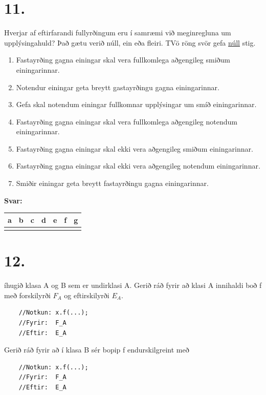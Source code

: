 \documentclass{article}
\newcommand{\sv}{\textbf{Svar:}}
\newcommand{\enum}{\begin{enumerate}[label = \alph*.]}
\begin{document}
    \newpage
    \section{11.}
    Hverjar af eftirfarandi fullyrðingum eru í samræmi við meginregluna um upplýsingahuld? 
    Það gætu verið núll, ein eða fleiri. TVö röng svör gefa \underline{núll} stig.

    \enum
    \item Fastayrðing gagna einingar skal vera fullkomlega aðgengileg smiðum einingarinnar.
    \item Notendur einingar geta breytt gastayrðingu gagna einingarinnar.
    \item Gefa skal notendum einingar fullkomnar upplýsingar um smíð einingarinnar.
    \item Fastayrðing gagna einingar skal vera fullkomlega aðgengileg notendum einingarinnar.
    \item Fastayrðing gagna einingar skal ekki vera aðgengileg smiðum einingarinnar.
    \item Fastayrðing gagna einingar skal ekki vera aðgengileg notendum einingarinnar.
    \item Smiðir einingar geta breytt fastayrðingu gagna einingarinnar.
\end{enumerate}


    \sv

    
\begin{tabularx}{\textwidth}{ |X|X|X|X|X|X|X|}
    \hline
    \textbf{a}  & \textbf{b}  & \textbf{c}  & \textbf{d}  & \textbf{e}  & \textbf{f}  & \textbf{g} \\ \hline
     & & & & & & \\ \hline
 \end{tabularx}


 \newpage

 \section{12.}

 íhugið klasa A og B sem er undirklasi A. Gerið ráð fyrir að klasi A innihaldi boð f með forskilyrði $F_A$ og eftirskilyrði $E_A$.
 \begin{verbatim}
    //Notkun: x.f(...);
    //Fyrir:  F_A
    //Eftir:  E_A
 \end{verbatim}

 Gerið ráð fyrir að í klasa B sér bopip f endurskilgreint með
 \begin{verbatim}
    //Notkun: x.f(...);
    //Fyrir:  F_A
    //Eftir:  E_A
 \end{verbatim}
\end{document}
